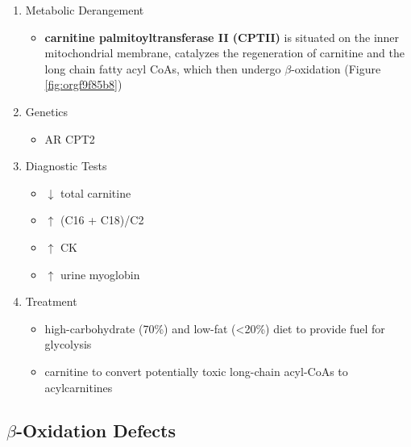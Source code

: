 \documentclass[12pt]{scrartcl}
\begin{document}
\begin{enumerate}
\item Metabolic Derangement
\label{sec:org7adc059}
\begin{itemize}
\item \textbf{carnitine palmitoyltransferase II (CPTII)} is situated on the inner
mitochondrial membrane, catalyzes the regeneration of carnitine and
the long chain fatty acyl CoAs, which then undergo \(\beta\)-oxidation
(Figure \ref{fig:orgf9f85b8})
\end{itemize}
\item Genetics
\label{sec:org8c29297}
\begin{itemize}
\item AR CPT2
\end{itemize}
\item Diagnostic Tests
\label{sec:org11dd2f2}
\begin{itemize}
\item \(\downarrow\) total carnitine
\item \(\uparrow\) (C16 + C18)/C2
\item \(\uparrow\) CK
\item \(\uparrow\) urine myoglobin
\end{itemize}
\item Treatment
\label{sec:orgb74ea8b}
\begin{itemize}
\item high-carbohydrate (70\%) and low-fat (<20\%) diet to provide fuel for glycolysis
\item carnitine to convert potentially toxic long-chain acyl-CoAs to
acylcarnitines
\end{itemize}
\end{enumerate}
\subsection{\(\beta\)-Oxidation Defects}
\label{sec:org8f7f942}
\end{document}
